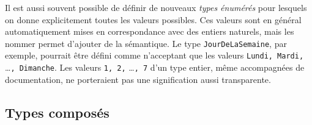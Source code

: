 \documentclass[a4paper,francais]{insalyon}
\begin{document}
Il est aussi souvent possible de définir de nouveaux \emph{types énumérés} pour lesquels on donne explicitement toutes les valeurs possibles. Ces valeurs sont en général automatiquement mises en correspondance avec des entiers naturels, mais les nommer permet d'ajouter de la sémantique. Le type \texttt{JourDeLaSemaine}, par exemple, pourrait être défini comme n'acceptant que les valeurs \verb!Lundi, Mardi,! \ldots \verb!, Dimanche!. Les valeurs \verb!1, 2,! \ldots \verb!, 7! d'un type entier, même accompagnées de documentation, ne porteraient pas une signification aussi transparente.    

\subsection{Types composés}
\label{sec:types-composes}
\end{document}
